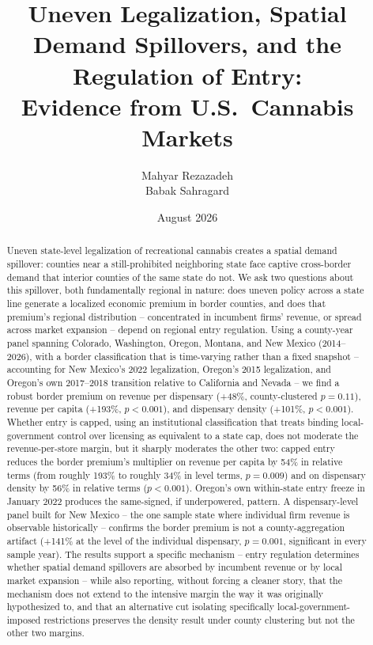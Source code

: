 \documentclass[12pt]{article}
\title{Uneven Legalization, Spatial Demand Spillovers, and the Regulation of Entry:\\
Evidence from U.S.\ Cannabis Markets}
\author{Mahyar Rezazadeh \\ Babak Sahragard}
\date{August 2026}
\begin{document}
\maketitle

\begin{abstract}
\noindent Uneven state-level legalization of recreational cannabis creates a spatial demand spillover: counties
near a still-prohibited neighboring state face captive cross-border demand that interior counties of the same
state do not. We ask two questions about this spillover, both fundamentally regional in nature: does uneven
policy across a state line generate a localized economic premium in border counties, and does that premium's
regional distribution -- concentrated in incumbent firms' revenue, or spread across market expansion -- depend
on regional entry regulation. Using a county-year panel spanning Colorado, Washington, Oregon, Montana, and
New Mexico (2014--2026), with a border classification that is time-varying rather than a fixed snapshot --
accounting for New Mexico's 2022 legalization, Oregon's 2015 legalization, and Oregon's own 2017--2018
transition relative to California and Nevada -- we find a robust border premium on revenue per dispensary
(+48\%, county-clustered $p=0.11$), revenue per capita (+193\%, $p<0.001$), and dispensary density (+101\%,
$p<0.001$). Whether entry is capped, using an institutional classification that treats binding local-government
control over licensing as equivalent to a state cap, does not moderate the revenue-per-store margin, but it
sharply moderates the other two: capped entry reduces the border premium's multiplier on revenue per capita by
54\% in relative terms (from roughly 193\% to roughly 34\% in level terms, $p=0.009$) and on dispensary
density by 56\% in relative terms ($p<0.001$). Oregon's own within-state
entry freeze in January 2022 produces the same-signed, if underpowered, pattern. A dispensary-level panel built
for New Mexico -- the one sample state where individual firm revenue is observable historically -- confirms the
border premium is not a county-aggregation artifact (+141\% at the level of the individual dispensary,
$p=0.001$, significant in every sample year). The results support a
specific mechanism -- entry regulation determines whether spatial demand spillovers are absorbed by incumbent
revenue or by local market expansion -- while also reporting, without forcing a cleaner story, that the
mechanism does not extend to the intensive margin the way it was originally hypothesized to, and that an
alternative cut isolating specifically local-government-imposed restrictions preserves the density result
under county clustering but not the other two margins.
\end{abstract}
\end{document}
